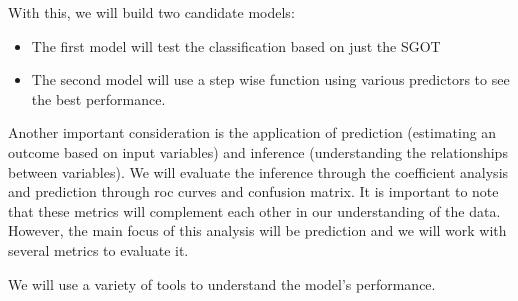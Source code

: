 \documentclass[
]{article}
\newenvironment{Shaded}{\begin{snugshade}}{\end{snugshade}}
\newcommand{\DecValTok}[1]{\textcolor[rgb]{0.00,0.00,0.81}{#1}}
\newcommand{\FunctionTok}[1]{\textcolor[rgb]{0.13,0.29,0.53}{\textbf{#1}}}
\newcommand{\NormalTok}[1]{#1}
\newcommand{\OtherTok}[1]{\textcolor[rgb]{0.56,0.35,0.01}{#1}}
\newcommand{\SpecialCharTok}[1]{\textcolor[rgb]{0.81,0.36,0.00}{\textbf{#1}}}
\newcommand{\StringTok}[1]{\textcolor[rgb]{0.31,0.60,0.02}{#1}}
\begin{document}
With this, we will build two candidate models:

\begin{itemize}
\item
  The first model will test the classification based on just the SGOT
\item
  The second model will use a step wise function using various
  predictors to see the best performance.
\end{itemize}

Another important consideration is the application of prediction
(estimating an outcome based on input variables) and inference
(understanding the relationships between variables). We will evaluate
the inference through the coefficient analysis and prediction through
roc curves and confusion matrix. It is important to note that these
metrics will complement each other in our understanding of the data.
However, the main focus of this analysis will be prediction and we will
work with several metrics to evaluate it.

We will use a variety of tools to understand the model's performance.

\begin{Shaded}
\end{Shaded}
\end{document}

